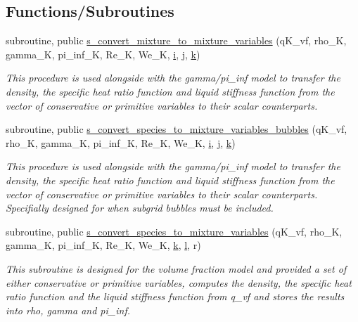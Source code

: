 \subsection*{Functions/\+Subroutines}
\begin{DoxyCompactItemize}
\item 
subroutine, public \hyperlink{namespacem__variables__conversion_a613c09e8438e535e8c13f15282493793}{s\+\_\+convert\+\_\+mixture\+\_\+to\+\_\+mixture\+\_\+variables} (q\+K\+\_\+vf, rho\+\_\+K, gamma\+\_\+K, pi\+\_\+inf\+\_\+K, Re\+\_\+K, We\+\_\+K, \hyperlink{m__rhs_8f90_aaea4baed8fd8b780f6938f0dc1fb0f72}{i}, \hyperlink{m__rhs_8f90_aeadbc0ce9b66517f8fde156199772ec1}{j}, \hyperlink{m__rhs_8f90_af22c486581933c52df7d4aa306382074}{k})
\begin{DoxyCompactList}\small\item\em This procedure is used alongside with the gamma/pi\+\_\+inf model to transfer the density, the specific heat ratio function and liquid stiffness function from the vector of conservative or primitive variables to their scalar counterparts. \end{DoxyCompactList}\item 
subroutine, public \hyperlink{namespacem__variables__conversion_abe0d038aac3b3f0166c1a0c93c497e33}{s\+\_\+convert\+\_\+species\+\_\+to\+\_\+mixture\+\_\+variables\+\_\+bubbles} (q\+K\+\_\+vf, rho\+\_\+K, gamma\+\_\+K, pi\+\_\+inf\+\_\+K, Re\+\_\+K, We\+\_\+K, \hyperlink{m__rhs_8f90_aaea4baed8fd8b780f6938f0dc1fb0f72}{i}, \hyperlink{m__rhs_8f90_aeadbc0ce9b66517f8fde156199772ec1}{j}, \hyperlink{m__rhs_8f90_af22c486581933c52df7d4aa306382074}{k})
\begin{DoxyCompactList}\small\item\em This procedure is used alongside with the gamma/pi\+\_\+inf model to transfer the density, the specific heat ratio function and liquid stiffness function from the vector of conservative or primitive variables to their scalar counterparts. Specifially designed for when subgrid bubbles must be included. \end{DoxyCompactList}\item 
subroutine, public \hyperlink{namespacem__variables__conversion_a0670171466cd1ce584495face34cc4de}{s\+\_\+convert\+\_\+species\+\_\+to\+\_\+mixture\+\_\+variables} (q\+K\+\_\+vf, rho\+\_\+K, gamma\+\_\+K, pi\+\_\+inf\+\_\+K, Re\+\_\+K, We\+\_\+K, \hyperlink{m__rhs_8f90_af22c486581933c52df7d4aa306382074}{k}, \hyperlink{m__rhs_8f90_a2ac747380de0e6e5e11b01f4137fb75c}{l}, r)
\begin{DoxyCompactList}\small\item\em This subroutine is designed for the volume fraction model and provided a set of either conservative or primitive variables, computes the density, the specific heat ratio function and the liquid stiffness function from q\+\_\+vf and stores the results into rho, gamma and pi\+\_\+inf. \end{DoxyCompactList}\item 

\end{DoxyCompactItemize}
